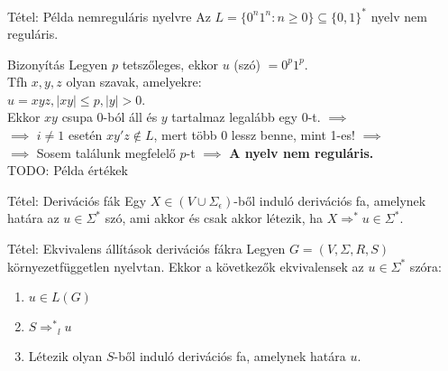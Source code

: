 \documentclass{beamer}
\begin{document}
\begin{frame}
\begin{block}{Tétel: Példa nemreguláris nyelvre}
Az $L = \{0^n1^n : n \geq 0\} \subseteq \{0, 1\}^*$ nyelv nem reguláris.
\end{block}

\begin{block}{Bizonyítás}
Legyen $p$  tetszőleges, ekkor $u$ (szó) $ = 0^p1^p$.\\
Tfh $x, y, z$ olyan szavak, amelyekre:\\
$u = xyz, |xy| \leq p, |y| > 0$.\\
\bigskip
Ekkor $xy$ csupa 0-ból áll és $y$ tartalmaz legalább egy 0-t. $\implies$\\
$\implies$ $i \neq 1$ esetén $xy'z \notin L$, mert több 0 lessz benne, mint 1-es! $\implies$\\
$\implies$ Sosem találunk megfelelő $p$-t $\implies$ \textbf{A nyelv nem reguláris.}\\
\bigskip
TODO: Példa értékek
\end{block}

\end{frame}


\begin{frame}
\begin{block}{Tétel: Derivációs fák}
Egy $X \in (V \cup {\Sigma}_{\epsilon})$-ből induló derivációs fa, amelynek határa az $u \in {\Sigma}^*$ szó, ami akkor és csak akkor létezik, ha $X {\Rightarrow}^* u \in {\Sigma}^*$.
\end{block}

\begin{block}{Tétel: Ekvivalens állítások derivációs fákra}
Legyen $G = (V, {\Sigma}, R, S)$ környezetfüggetlen nyelvtan. Ekkor a következők ekvivalensek az $u \in {\Sigma}^*$ szóra:\\
\begin{enumerate}
\item $u \in L(G)$
\item $S {{\Rightarrow}^*}_l u$
\item Létezik olyan $S$-ből induló derivációs fa, amelynek határa $u$.
\end{enumerate}

\end{block}

\end{frame}
\end{document}
